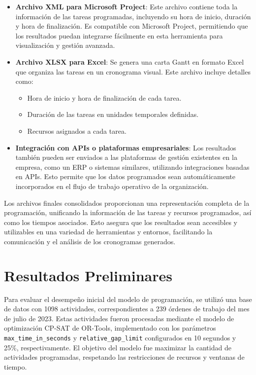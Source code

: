 \documentclass{article}
\begin{document}
\begin{itemize}
    \item \textbf{Archivo XML para Microsoft Project}: Este archivo contiene toda la información de las tareas programadas, incluyendo su hora de inicio, duración y hora de finalización. Es compatible con Microsoft Project, permitiendo que los resultados puedan integrarse fácilmente en esta herramienta para visualización y gestión avanzada.

    \item \textbf{Archivo XLSX para Excel}: Se genera una carta Gantt en formato Excel que organiza las tareas en un cronograma visual. Este archivo incluye detalles como:
    \begin{itemize}
        \item Hora de inicio y hora de finalización de cada tarea.
        \item Duración de las tareas en unidades temporales definidas.
        \item Recursos asignados a cada tarea.
    \end{itemize}

    \item \textbf{Integración con APIs o plataformas empresariales}: Los resultados también pueden ser enviados a las plataformas de gestión existentes en la empresa, como un ERP o sistemas similares, utilizando integraciones basadas en APIs. Esto permite que los datos programados sean automáticamente incorporados en el flujo de trabajo operativo de la organización.
\end{itemize}

Los archivos finales consolidados proporcionan una representación completa de la programación, unificando la información de las tareas y recursos programados, así como los tiempos asociados. Esto asegura que los resultados sean accesibles y utilizables en una variedad de herramientas y entornos, facilitando la comunicación y el análisis de los cronogramas generados.

\section{Resultados Preliminares}

Para evaluar el desempeño inicial del modelo de programación, se utilizó una base de datos con 1098 actividades, correspondientes a 239 órdenes de trabajo del mes de julio de 2023. Estas actividades fueron procesadas mediante el modelo de optimización CP-SAT de OR-Tools, implementado con los parámetros \texttt{max\_time\_in\_seconds} y \texttt{relative\_gap\_limit} configurados en 10 segundos y 25\%, respectivamente. El objetivo del modelo fue maximizar la cantidad de actividades programadas, respetando las restricciones de recursos y ventanas de tiempo.
\end{document}
